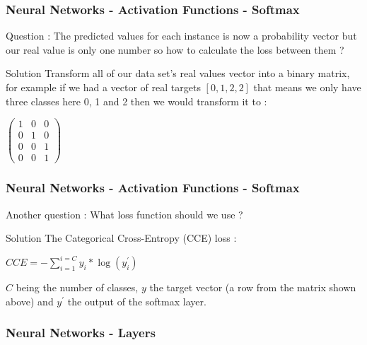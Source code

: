 \documentclass{beamer}
\begin{document}
\begin{frame}
\frametitle{Neural Networks - Activation Functions - Softmax}
Question : The predicted values for each instance is now a probability vector but our real value is only one number so how to calculate the loss between them ?\\
\begin{block}{Solution}
Transform all of our data set's real values vector into a binary matrix, for example if we had a vector of real targets $ [0,1,2,2] $ that means we only have three classes here 0, 1 and 2 then we would transform it to :
\begin{center}
$\begin{pmatrix}
1 & 0 & 0\\
0 & 1 & 0\\
0 & 0 & 1\\
0 & 0 & 1
\end{pmatrix}$
\end{center}
\end{block}
\end{frame}

\begin{frame}
\frametitle{Neural Networks - Activation Functions - Softmax}
Another question : What loss function should we use ?\\
\begin{block}{Solution}
The Categorical Cross-Entropy (CCE) loss :
\begin{center}
$ CCE = -\sum_{i=1}^{i=C}y_i*\log(y^{\prime}_i) $
\end{center}
$ C $ being the number of classes, $ y $ the target vector (a row from the matrix shown above) and $ y^{\prime} $ the output of the softmax layer.
\end{block}
\end{frame}

\begin{frame}
\frametitle{Neural Networks - Layers}

\end{frame}
\end{document}
